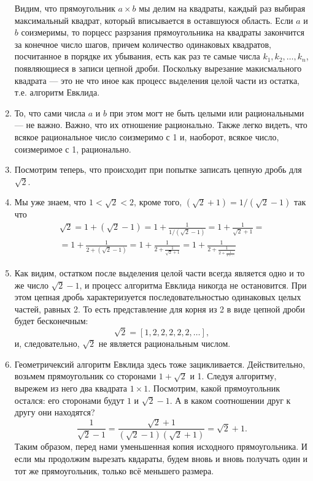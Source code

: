 \begin{enumerate}
Видим, что прямоугольник $a\times b$ мы делим на квадраты, каждый раз выбирая максимальный квадрат, который вписывается в оставшуюся область. Если $a$ и $b$ соизмеримы, то порцесс разрзания прямоугольника на квадраты закончится за конечное число шагов, причем количество одинаковых квадратов, посчитанное в порядке их убывания, есть как раз те самые числа $k_1,k_2,\dots,k_n$, появляющиеся в записи цепной дроби. Поскольку вырезание макисмального квадрата --- это не что иное как процесс выделения целой части из остатка, т.е. алгоритм Евклида.
\item То, что сами числа $a$ и $b$ при этом могт не быть целыми или рациональными --- не важно. Важно, что их отношение рационально. Также легко видеть, что всякое рациональное число соизмеримо с 1 и, наоборот, всякое число, соизмеримое с 1, рационально.
\item Посмотрим теперь, что происходит при попытке записать цепную дробь для $\sqrt 2$.
\item Мы уже знаем, что $1<\sqrt 2<2$, кроме того, $(\sqrt 2+1)=1/(\sqrt 2-1)$ так что
\begin{multline*}
\sqrt 2 = \boxed{1} + (\sqrt 2-1) = \boxed{1} + \frac{1}{1/(\sqrt 2-1)} = 
\boxed{1} + \frac{1}{\sqrt 2+1} = \\ 
= \boxed{1} + \frac{1}{\boxed{2} + (\sqrt 2-1)} = 
\boxed{1} + \frac{1}{\boxed{2} + \frac{1}{\sqrt 2+1}} = 
\boxed{1} + \frac{1}{\boxed{2} + \frac{1}{\boxed{2} + \frac{1}{\boxed{2} + \dots}}}
\end{multline*}
\item Как видим, остатком после выделения целой части всегда является одно и то же число $\sqrt 2-1$, и процесс алгоритма Евклида никогда не остановится. При этом цепная дробь характеризуется последовательностью одинаковых целых частей, равных 2. То есть представление для корня из 2 в виде цепной дроби будет бесконечным:
$$
\sqrt 2 = [1,2,2,2,2,2,\dots],
$$
и, следовательно, $\sqrt 2$ не является рациональным числом.
\item Геометричексий алгоритм Евклида здесь тоже зацикливается. Действительно, возьмем прямоугольник со сторонами $1+\sqrt 2$ и 1. Следуя алгоритму, вырежем из него два квадрата $1\times 1$. Посмотрим, какой прямоугольник остался: его сторонами будут $1$ и $\sqrt 2-1$. А в каком соотношении друг к другу они находятся?
$$
\frac{1}{\sqrt 2-1}=\frac{\sqrt{2}+1}{(\sqrt 2-1)(\sqrt 2+1)}=\sqrt 2+1.
$$
Таким образом, перед нами уменьшенная копия исходного прямоугольника. И если мы продолжим вырезать квдараты, будем вновь и вновь получать один и тот же прямоугольник, только всё меньшего размера.



\end{enumerate}
